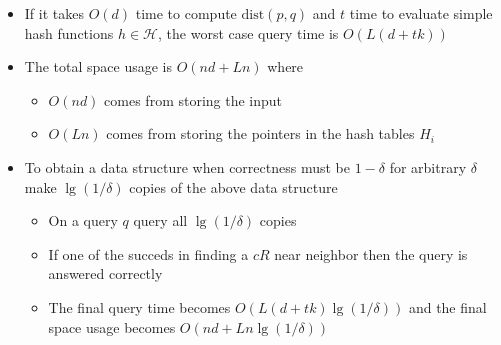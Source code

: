 \begin{itemize}
  \item If it takes $O(d)$ time to compute $\text{dist}(p,q)$ and $t$ time to evaluate simple hash functions $h \in \mathcal H$, the worst case query time is $O(L(d + tk))$
  \item The total space usage is $O(nd + Ln)$ where 
  \begin{itemize}
  	\item $O(nd)$ comes from storing the input
  	\item $O(Ln)$ comes from storing the pointers in the hash tables $H_i$
  \end{itemize}
  \item To obtain a data structure when correctness must be $1-\delta$ for arbitrary $\delta$ make $\lg(1/\delta)$ copies of the above data structure
  \begin{itemize}
  	\item On a query $q$ query all $\lg(1/\delta)$ copies
  	\item If one of the succeds in finding a $cR$ near neighbor then the query is answered correctly
  	\item The final query time becomes $O(L(d+t k) \lg (1 / \delta))$ and the final space usage becomes $O(n d+L n \lg (1 / \delta))$
  \end{itemize}
\end{itemize}


